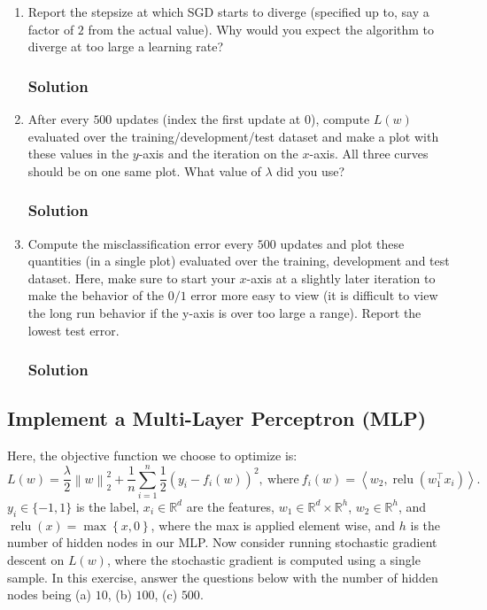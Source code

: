 \documentclass[letterpaper,11pt]{article}
\begin{document}
\begin{enumerate}
\item Report the stepsize at which SGD starts to diverge (specified up to, say a
  factor of $2$ from the actual value). Why would you expect the algorithm to
  diverge at too large a learning rate?

  \subsubsection*{Solution}

\item After every $500$ updates (index the first update at $0$), compute $L(w)$
  evaluated over the training/development/test dataset and make a plot with
  these values in the $y$-axis and the iteration on the $x$-axis. All three
  curves should be on one same plot. What value of $\lambda$ did you use?

  \subsubsection*{Solution}
  
\item Compute the misclassification error every $500$ updates and plot these
  quantities (in a single plot) evaluated over the training, development and
  test dataset. Here, make sure to start your $x$-axis at a slightly later
  iteration to make the behavior of the $0/1$ error more easy to view (it is
  difficult to view the long run behavior if the y-axis is over too large a
  range). Report the lowest test error.

  \subsubsection*{Solution}
\end{enumerate}

\subsection*{Implement a Multi-Layer Perceptron (MLP)}

Here, the objective function we choose to optimize is:
\begin{equation}
  L(w) = \frac{\lambda}{2}\left\lVert w \right\rVert_2^2  + \frac{1}{n}\sum_{i=1}^n\frac{1}{2}\left(y_i - f_i(w)\right)^2,~\text{where}~
  f_i(w) = \left\langle w_2, \operatorname{relu}\left(w_1^\intercal x_i\right)\right\rangle.
\end{equation}
$y_i \in \{-1, 1\}$ is the label, $x_i \in \mathbb{R}^d$ are the features,
$w_1 \in \mathbb{R}^d \times \mathbb{R}^h$, $w_2 \in \mathbb{R}^h$, and
$\operatorname{relu}(x) = \max\left\{x, 0\right\}$, where the max is applied
element wise, and $h$ is the number of hidden nodes in our MLP.  Now consider
running stochastic gradient descent on $L(w)$, where the stochastic gradient is
computed using a single sample. In this exercise, answer the questions below
with the number of hidden nodes being (a) $10$, (b) $100$, (c) $500$.
\end{document}
